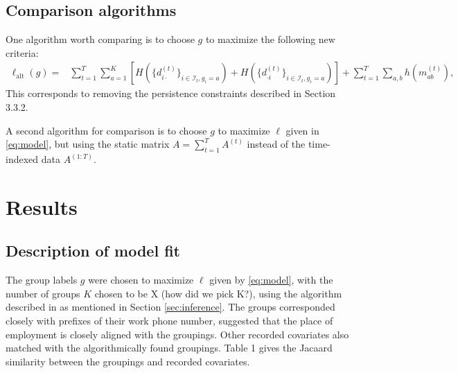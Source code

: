 \documentclass{article}
\begin{document}


\subsection{Comparison algorithms} \label{sec:other algorithms}

One algorithm worth comparing is to choose $g$ to maximize the following new criteria:
\begin{align} \label{eq:alternative}
\ell_{\textrm{alt}}(g) =& \sum_{t=1}^T \sum_{a=1}^K \left[ H\left(\{d_{i\cdot}^{(t)}\}_{i \in \mathcal{I}_t, g_i=a}\right) + H\left(\{d_{\cdot i}^{(t)}\}_{i \in \mathcal{I}_t, g_i=a}\right) \right] + \sum_{t=1}^T \sum_{a,b} h(m_{ab}^{(t)}),
\end{align}
This corresponds to removing the persistence constraints described in Section 3.3.2.

A second algorithm for comparison is to choose $g$ to maximize $\ell$ given in \eqref{eq:model}, but using the static matrix $A = \sum_{t=1}^T A^{(t)}$ instead of the time-indexed data $A^{(1:T)}$.

\section{Results}

\subsection{Description of model fit}
The group labels $g$ were chosen to maximize $\ell$ given by \eqref{eq:model}, with the number of groups $K$ chosen to be X (how did we pick K?), using the algorithm described in \cite{karrer2011stochastic} as mentioned in Section \ref{sec:inference}. The groups corresponded closely with prefixes of their work phone number, suggested that the place of employment is closely aligned with the groupings. Other recorded covariates also matched with the algorithmically found groupings. Table 1 gives the Jacaard similarity between the groupings and recorded covariates. 
\end{document}
